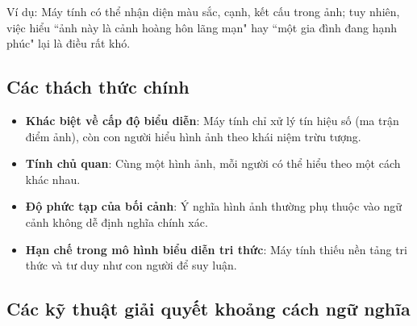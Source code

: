 \documentclass[12pt]{article}
\begin{document}
	Ví dụ: Máy tính có thể nhận diện màu sắc, cạnh, kết cấu trong ảnh; tuy nhiên, việc hiểu ``ảnh này là cảnh hoàng hôn lãng mạn" hay ``một gia đình đang hạnh phúc" lại là điều rất khó.
	
	\subsection{Các thách thức chính}
	
	\begin{itemize}
	\item \textbf{Khác biệt về cấp độ biểu diễn}: Máy tính chỉ xử lý tín hiệu số (ma trận điểm ảnh), còn con người hiểu hình ảnh theo khái niệm trừu tượng.
	\item \textbf{Tính chủ quan}: Cùng một hình ảnh, mỗi người có thể hiểu theo một cách khác nhau.
	\item \textbf{Độ phức tạp của bối cảnh}: Ý nghĩa hình ảnh thường phụ thuộc vào ngữ cảnh không dễ định nghĩa chính xác.
	\item \textbf{Hạn chế trong mô hình biểu diễn tri thức}: Máy tính thiếu nền tảng tri thức và tư duy như con người để suy luận.
	\end{itemize}
	
	\subsection{Các kỹ thuật giải quyết khoảng cách ngữ nghĩa}
	
\end{document}
